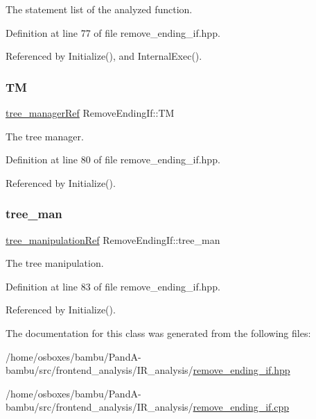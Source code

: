 The statement list of the analyzed function. 



Definition at line 77 of file remove\+\_\+ending\+\_\+if.\+hpp.



Referenced by Initialize(), and Internal\+Exec().

\mbox{\label{classRemoveEndingIf_a1f7b5de0a7120ec43e2ba80e9ff6a2fb}} 
\subsubsection{\texorpdfstring{TM}{TM}}
{\footnotesize\ttfamily \hyperlink{tree__manager_8hpp_a96ff150c071ce11a9a7a1e40590f205e}{tree\+\_\+manager\+Ref} Remove\+Ending\+If\+::\+TM\hspace{0.3cm}{\ttfamily [private]}}



The tree manager. 



Definition at line 80 of file remove\+\_\+ending\+\_\+if.\+hpp.



Referenced by Initialize().

\mbox{\label{classRemoveEndingIf_a7136fb1720ad7497db9d77e6b6978dad}} 
\subsubsection{\texorpdfstring{tree\+\_\+man}{tree\_man}}
{\footnotesize\ttfamily \hyperlink{tree__manipulation_8hpp_a1a9460e3a2f9fc6a96cfd2f24cc9b2a5}{tree\+\_\+manipulation\+Ref} Remove\+Ending\+If\+::tree\+\_\+man\hspace{0.3cm}{\ttfamily [private]}}



The tree manipulation. 



Definition at line 83 of file remove\+\_\+ending\+\_\+if.\+hpp.



Referenced by Initialize().



The documentation for this class was generated from the following files\+:\begin{DoxyCompactItemize}
\item 
/home/osboxes/bambu/\+Pand\+A-\/bambu/src/frontend\+\_\+analysis/\+I\+R\+\_\+analysis/\hyperlink{remove__ending__if_8hpp}{remove\+\_\+ending\+\_\+if.\+hpp}\item 
/home/osboxes/bambu/\+Pand\+A-\/bambu/src/frontend\+\_\+analysis/\+I\+R\+\_\+analysis/\hyperlink{remove__ending__if_8cpp}{remove\+\_\+ending\+\_\+if.\+cpp}\end{DoxyCompactItemize}
